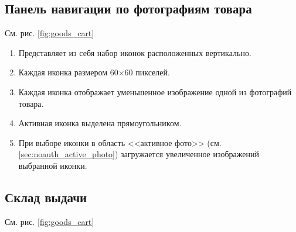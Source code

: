         \subsection{Панель навигации по фотографиям товара}
            См. рис. \ref{fig:goods_cart}
            
            \begin{enumerate}
                \item Представляет из себя набор иконок расположенных 
                    вертикально.
                \item Каждая иконка размером 60$\times$60 пикселей.
                \item Каждая иконка отображает уменьшенное изображение одной 
                из фотографий товара.
                \item Активная иконка выделена прямоугольником.
                \item При выборе иконки в область <<активное фото>> (см. 
                \ref{sec:noauth_active_photo}) 
                    загружается увеличенное изображений выбранной иконки.
            \end{enumerate}
            
        \subsection{Склад выдачи}\label{sec:goods_cart_stores} 

            См. рис. \ref{fig:goods_cart}

